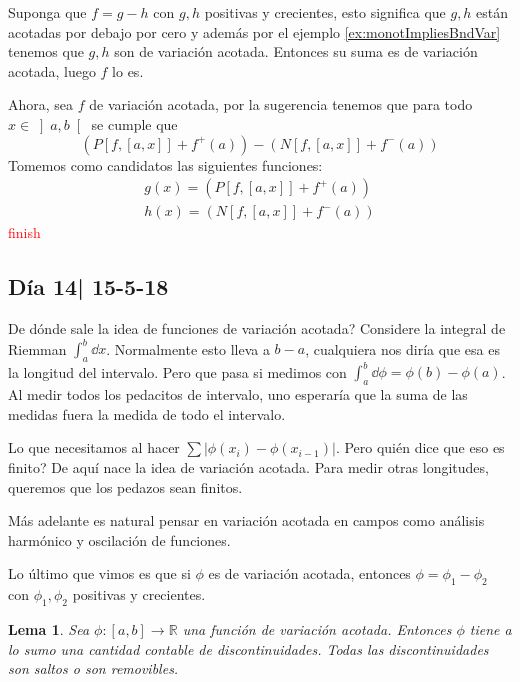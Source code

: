 \documentclass[12pt]{article}
\theoremstyle{plain}
\newtheorem{Lem}[Th]{Lema}             %
\theoremstyle{definition}
\theoremstyle{remark}
\numberwithin{equation}{section}
\newcommand{\bR}{\mathbb{R}}        %
\renewcommand{\:}{\colon}           %
\newcommand{\bonj}[1]{\left\lbrack#1\right\rbrack}
\newcommand{\obonj}[1]{\left\rbrack#1\right\lbrack}
\begin{document}
\begin{multicols}{2}
\begin{ptcb}
Suponga que $f=g-h$ con $g,h$ positivas y crecientes, esto significa que $g,h$ están acotadas por debajo por cero y además por el ejemplo \ref{ex:monotImpliesBndVar} tenemos que $g,h$ son de variación acotada. Entonces su suma es de variación acotada, luego $f$ lo es.\par
Ahora, sea $f$ de variación acotada, por la sugerencia tenemos que para todo $x\in\obonj{a,b}$ se cumple que
$$\left(P\bonj{f,\bonj{a,x}}+f^+(a)\right)-\left(N\bonj{f,\bonj{a,x}}+f^-(a)\right)$$
Tomemos como candidatos las siguientes funciones:
 \begin{gather*}
   g(x)=\left(P\bonj{f,\bonj{a,x}}+f^+(a)\right)\\
   h(x)=\left(N\bonj{f,\bonj{a,x}}+f^-(a)\right)
 \end{gather*}
\textcolor{red}{finish}

\end{ptcb}
\subsection{Día 14| 15-5-18}

De dónde sale la idea de funciones de variación acotada? Considere la integral de Riemman $\int_{a}^{b}\dd x$. Normalmente esto lleva a $b-a$, cualquiera nos diría que esa es la longitud del intervalo. Pero que pasa si medimos con $\int_{a}^{b}\dd\phi=\phi(b)-\phi(a)$. Al medir todos los pedacitos de intervalo, uno esperaría que la suma de las medidas fuera la medida de todo el intervalo. \par
Lo que necesitamos al hacer $\sum|\phi(x_i)-\phi(x_{i-1})|$. Pero quién dice que eso es finito? De aquí nace la idea de variación acotada. Para medir otras longitudes, queremos que los pedazos sean finitos.\par
Más adelante es natural pensar en variación acotada en campos como análisis harmónico y oscilación de funciones.\par
Lo último que vimos es que si $\phi$ es de variación acotada, entonces $\phi=\phi_1-\phi_2$ con $\phi_1,\phi_2$ positivas y crecientes.

\begin{Lem}
  Sea $\phi\:\bonj{a,b}\to\bR$ una función de variación acotada. Entonces $\phi$ tiene a lo sumo una cantidad contable de discontinuidades. Todas las discontinuidades son saltos o son removibles.
\end{Lem}


\end{multicols}
\end{document}
